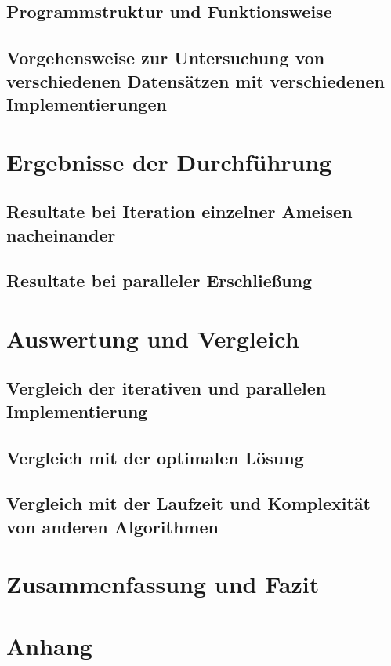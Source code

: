 \documentclass[doktyp=barbeit, sprache=german]{TUBAFarbeiten}
\begin{document}
\subsection{Programmstruktur und Funktionsweise}
\subsection{Vorgehensweise zur Untersuchung von verschiedenen Datensätzen mit verschiedenen Implementierungen}
\section{Ergebnisse der Durchführung}
\subsection{Resultate bei Iteration einzelner Ameisen nacheinander}
\subsection{Resultate bei paralleler Erschließung}
\section{Auswertung und Vergleich}
\subsection{Vergleich der iterativen und parallelen Implementierung}
\subsection{Vergleich mit der optimalen Lösung}
\subsection{Vergleich mit der Laufzeit und Komplexität von anderen Algorithmen}
\section{Zusammenfassung und Fazit}
\section{Anhang}
\newpage
{}
\end{document}
